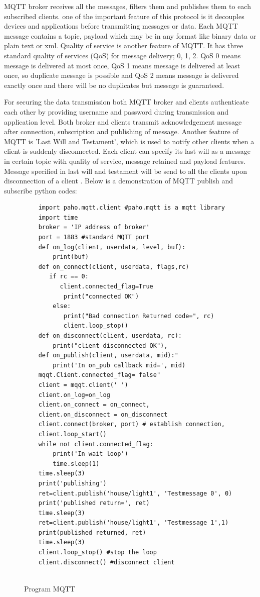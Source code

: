 \documentclass[sigconf]{acmart}
\begin{document}
MQTT broker receives all the messages, filters them and publishes them to each subscribed clients. one of the important feature of this protocol is it decouples devices and applications before transmitting messages or data. Each MQTT message contains a topic, payload which may be in any format like binary data or plain text or xml. Quality of service is another feature of MQTT. It has three standard quality of services (QoS) for message delivery; 0, 1, 2. QoS 0 means message is delivered at most once, QoS 1 means message is delivered at least once, so duplicate message is possible and QoS 2 means message is delivered exactly once and there will be no duplicates but message is guaranteed.

For securing the data transmission both MQTT broker and clients authenticate each other by providing username and password during transmission and application level. Both broker and clients transmit acknowledgement message after connection, subscription and publishing of message. Another feature of MQTT is 'Last Will and Testament', which is used to notify other clients when a client is suddenly disconnected. Each client can specify its last will  as a message in certain topic with quality of service, message retained and payload features. Message specified in last will and testament will be send to all the clients upon disconnection of a client \cite{hivemq}. Below is a demonstration of MQTT publish and subscribe python codes:

\begin{figure}[htb]

\begin{verbatim}
    import paho.mqtt.client #paho.mqtt is a mqtt library
    import time
    broker = 'IP address of broker'
    port = 1883 #standard MQTT port
    def on_log(client, userdata, level, buf):
        print(buf)
    def on_connect(client, userdata, flags,rc)
       if rc == 0:
          client.connected_flag=True 
           print("connected OK")
        else:
           print("Bad connection Returned code=", rc)
           client.loop_stop()
    def on_disconnect(client, userdata, rc):
        print("client disconnected OK"),
    def on_publish(client, userdata, mid):"
        print('In on_pub callback mid=', mid)
    mqqt.Client.connected_flag= false"
    client = mqqt.client(' ')
    client.on_log=on_log
    client.on_connect = on_connect,
    client.on_disconnect = on_disconnect
    client.connect(broker, port) # establish connection,
    client.loop_start()
    while not client.connected_flag:
        print('In wait loop')
        time.sleep(1)
    time.sleep(3)
    print('publishing')
    ret=client.publish('house/light1', 'Testmessage 0', 0)
    print('published return=', ret)
    time.sleep(3)
    ret=client.publish('house/light1', 'Testmessage 1',1)
    print(published returned, ret)
    time.sleep(3)
    client.loop_stop() #stop the loop
    client.disconnect() #disconnect client


\end{verbatim}
\caption{Program MQTT}\label{p:MQTT}
\end{figure}
\end{document}
